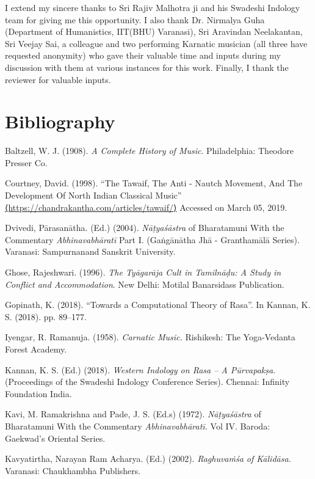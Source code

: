 I extend my sincere thanks to Sri Rajiv Malhotra ji and his Swadeshi Indology team for giving me this opportunity. I also thank Dr. Nirmalya Guha (Department of Humanistics, IIT(BHU) Varanasi), Sri Aravindan Neelakantan, Sri Veejay Sai, a colleague and two performing Karnatic musician (all three have requested anonymity) who gave their valuable time and inputs during my discussion with them at various instances for this work. Finally, I thank the reviewer for valuable inputs.


\section*{Bibliography}

\begin{thebibliography}{99}
\itemsep=0pt
 Baltzell, W. J. (1908). \textit{A Complete History of Music}. Philadelphia: Theodore Presser Co.

  Courtney, David. (1998). “The Tawaif, The Anti - Nautch Movement, And The Development Of North Indian Classical Music” \url{⟨https://chandrakantha.com/articles/tawaif/⟩} Accessed on March 05, 2019.

  Dvivedi, Pārasanātha. (Ed.) (2004). \textit{Nāṭyaśāstra} of Bharatamuni With the Commentary \textit{Abhinavabhāratī }Part I. (Gaṅgānātha Jhā - Granthamālā Series). Varanasi: Sampurnanand Sanskrit University.

  Ghose, Rajeshwari. (1996). \textit{The Tyāgarāja Cult in Tamilnāḍu: A Study in Conflict and Accommodation}. New Delhi: Motilal Banarsidass Publication.

  Gopinath, K. (2018). “Towards a Computational Theory of Rasa”. In Kannan, K. S. (2018). pp. 89--177.

  Iyengar, R. Ramanuja. (1958). \textit{Carnatic Music.} Rishikesh: The Yoga-Vedanta Forest Academy.

  Kannan, K. S. (Ed.) (2018). \textit{Western Indology on Rasa – A Pūrvapakṣa}. (Proceedings of the Swadeshi Indology Conference Series). Chennai: Infinity Foundation India.

  Kavi, M. Ramakrishna and Pade, J. S. (Ed.s) (1972). \textit{Nāṭyaśāstra} of Bharatamuni With the Commentary \textit{Abhinavabhāratī. }Vol IV. Baroda: Gaekwad’s Oriental Series.

  Kavyatirtha, Narayan Ram Acharya. (Ed.) (2002). \textit{Raghuvaṁśa of Kālidāsa.} Varanasi: Chaukhambha Publishers.


\end{thebibliography}
